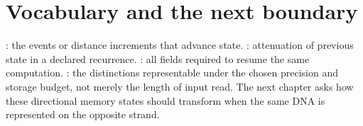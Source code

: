 \section{Vocabulary and the next boundary}
: the events or distance increments that advance state.
: attenuation of previous state in a declared recurrence.
: all fields required to resume the same computation.
: the distinctions representable under the
chosen precision and storage budget, not merely the length of input read.
The next chapter asks how these directional memory states should transform
when the same DNA is represented on the opposite strand.
